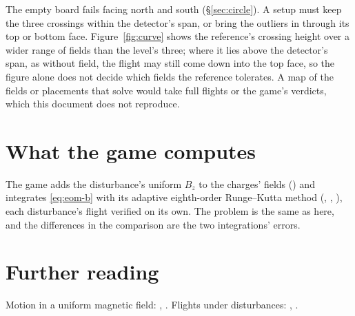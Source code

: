 \documentclass{leveldoc}
\begin{document}
The empty board fails facing north and south (\S\ref{sec:circle}). A setup must keep the three
crossings within the detector's span, or bring the outliers in through its top or bottom face.
Figure~\ref{fig:curve} shows the reference's crossing height over a wider range of fields than the
level's three; where it lies above the detector's span, as without field, the flight may still
come down into the top face, so the figure alone does not decide which fields the reference
tolerates. A map of the fields or placements that solve would take full flights or the game's
verdicts, which this document does not reproduce.

\section{What the game computes}\label{sec:engine}

The game adds the disturbance's uniform $B_z$ to the charges' fields () and integrates
\eqref{eq:eom-b} with its adaptive eighth-order Runge--Kutta method (, ,
), each disturbance's flight verified on its own. The problem is the same as here, and
the differences in the comparison are the two integrations' errors.

\section{Further reading}\label{sec:reading}

Motion in a uniform magnetic field: , . Flights under
disturbances: , .

\levelfileappendix
\end{document}
